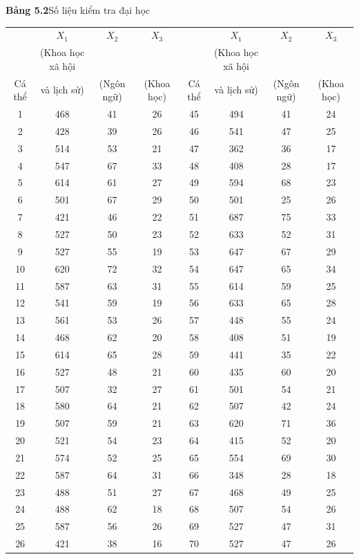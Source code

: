 \begin{center}
\begin{minipage}{\linewidth}\centering
\centering
{\normalsize\textbf{Bảng 5.2}\quad Số liệu kiểm tra đại học}\par\smallskip
\scriptsize
\renewcommand{\arraystretch}{0.98}
\setlength{\tabcolsep}{2pt}
\begin{tabular}{cccc@{\hspace{14pt}}cccc}
\hline
 & $X_1$ & $X_2$ & $X_3$ & & $X_1$ & $X_2$ & $X_3$\\
 & (Khoa học xã hội & & & & (Khoa học xã hội & & \\
Cá thể & và lịch sử) & (Ngôn ngữ) & (Khoa học) & Cá thể & và lịch sử) & (Ngôn ngữ) & (Khoa học)\\
\hline
1&468&41&26&45&494&41&24\\
2&428&39&26&46&541&47&25\\
3&514&53&21&47&362&36&17\\
4&547&67&33&48&408&28&17\\
5&614&61&27&49&594&68&23\\
6&501&67&29&50&501&25&26\\
7&421&46&22&51&687&75&33\\
8&527&50&23&52&633&52&31\\
9&527&55&19&53&647&67&29\\
10&620&72&32&54&647&65&34\\
11&587&63&31&55&614&59&25\\
12&541&59&19&56&633&65&28\\
13&561&53&26&57&448&55&24\\
14&468&62&20&58&408&51&19\\
15&614&65&28&59&441&35&22\\
16&527&48&21&60&435&60&20\\
17&507&32&27&61&501&54&21\\
18&580&64&21&62&507&42&24\\
19&507&59&21&63&620&71&36\\
20&521&54&23&64&415&52&20\\
21&574&52&25&65&554&69&30\\
22&587&64&31&66&348&28&18\\
23&488&51&27&67&468&49&25\\
24&488&62&18&68&507&54&26\\
25&587&56&26&69&527&47&31\\
26&421&38&16&70&527&47&26\\

\end{tabular}
\end{minipage}
\end{center}
